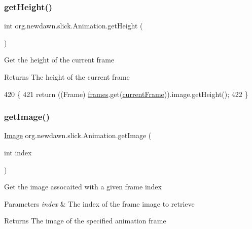 \subsubsection{\texorpdfstring{get\+Height()}{getHeight()}}
{\footnotesize\ttfamily int org.\+newdawn.\+slick.\+Animation.\+get\+Height (\begin{DoxyParamCaption}{ }\end{DoxyParamCaption})\hspace{0.3cm}{\ttfamily [inline]}}

Get the height of the current frame

\begin{DoxyReturn}{Returns}
The height of the current frame 
\end{DoxyReturn}

\begin{DoxyCode}
420                            \{
421         \textcolor{keywordflow}{return} ((Frame) \mbox{\hyperlink{classorg_1_1newdawn_1_1slick_1_1_animation_a39f0c6a16e479985b22f7dd3bb781bf7}{frames}}.get(\mbox{\hyperlink{classorg_1_1newdawn_1_1slick_1_1_animation_a358e1f2b9d9a05f83a416405e6bcd332}{currentFrame}})).image.getHeight();
422     \}
\end{DoxyCode}
\mbox{\label{classorg_1_1newdawn_1_1slick_1_1_animation_af3f5a3449169fd7735525ceb54edd78c}} 
\subsubsection{\texorpdfstring{get\+Image()}{getImage()}}
{\footnotesize\ttfamily \mbox{\hyperlink{classorg_1_1newdawn_1_1slick_1_1_image}{Image}} org.\+newdawn.\+slick.\+Animation.\+get\+Image (\begin{DoxyParamCaption}\item[{int}]{index }\end{DoxyParamCaption})\hspace{0.3cm}{\ttfamily [inline]}}

Get the image assocaited with a given frame index


\begin{DoxyParams}{Parameters}
{\em index} & The index of the frame image to retrieve \\
\hline
\end{DoxyParams}
\begin{DoxyReturn}{Returns}
The image of the specified animation frame 
\end{DoxyReturn}

